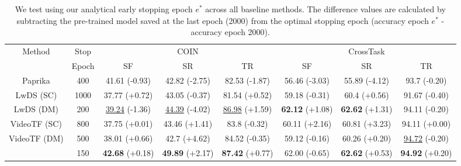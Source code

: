\begin{table}[t]
    \centering
    \caption{We test using our analytical early stopping epoch $e^*$ across all baseline methods. The difference values are calculated by subtracting the pre-trained model saved at the last epoch (2000) from the optimal stopping epoch (accuracy epoch $e^*$ - accuracy epoch 2000).}
    \scriptsize
    \begin{tabular}{c c|c c c|c c c}
        \multirow{2}{*}{Method} & Stop & \multicolumn{3}{|c|}{COIN} & \multicolumn{3}{|c}{CrossTask} \\
        & Epoch & SF & SR & TR & SF & SR & TR \\
        \hline
        Paprika & 400 & 41.61 (-0.93) & 42.82 (-2.75) & 82.53 (-1.87) & 56.46 (-3.03) & 55.89 (-4.12) & 93.7 (-0.20) \\
        LwDS (SC) & 1000 & 37.77 (+0.72) & 43.05 (-0.37) & 81.54 (+0.52) & 59.18 (-0.31) & 60.4 (+0.56) & 91.67 (-0.40) \\
        LwDS (DM) & 200 & \underline{39.24} (-1.36) & \underline{44.39} (-4.02) & \underline{86.98} (+1.59) & \textbf{62.12} (+1.08) & \textbf{62.62} (+1.31) & 94.11 (-0.20)\\
        VideoTF (SC) & 800 & 37.75 (+0.01) & 43.46 (+1.41) & 83.8 (-0.32) & 60.11 (+2.16) & 60.81 (+3.23) & 94.11 (+0.00) \\
        VideoTF (DM) & 500 & 38.01 (+0.66) & 42.7 (+4.62) & 84.52 (-0.35) & 59.12 (-0.16) & 60.26 (+0.20) & \underline{94.72} (-0.20) \\
        \hline
        \model{} & 150 & \textbf{42.68} (+0.18) & \textbf{49.89} (+2.17) & \textbf{87.42} (+0.77) & 62.00 (-0.65) & \textbf{62.62} (+0.53) & \textbf{94.92} (+0.20)
    \end{tabular}
    \label{tab:early_stopping}
\end{table}
